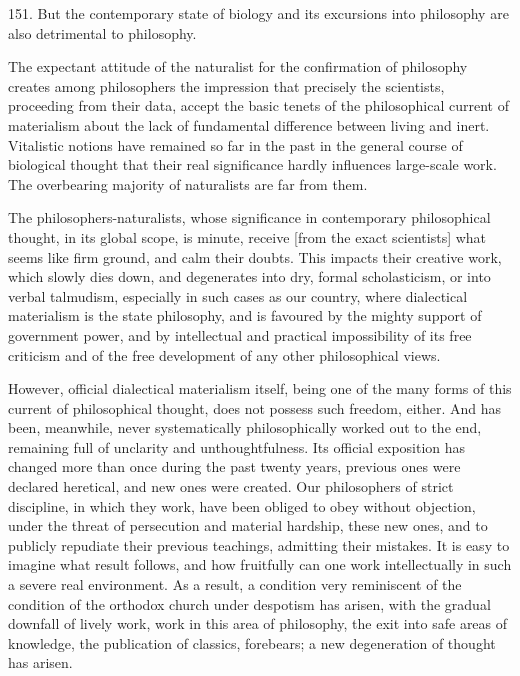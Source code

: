 
151. But the contemporary state of biology and its excursions into philosophy
are also detrimental to philosophy.

The expectant attitude of the naturalist for the confirmation of philosophy
creates among philosophers the impression that precisely the
scientists, proceeding from their data, accept the basic tenets of the
philosophical current of materialism about the lack of fundamental difference
between living and inert.  Vitalistic notions have remained so far in the past
in the general course of biological thought that their real significance hardly
influences large-scale work.  The overbearing majority of naturalists are far
from them.

The philosophers-naturalists, whose significance in contemporary philosophical
thought, in its global scope, is minute, receive [from the exact scientists]
what seems like firm ground, and calm their doubts.  This impacts their
creative work, which slowly dies down, and degenerates into dry, formal
scholasticism, or into verbal talmudism, especially in such cases as our
country, where dialectical materialism is the state philosophy, and is
favoured by the mighty support of government power, and by intellectual and
practical impossibility of its free criticism and of the free development of
any other philosophical views.

However, official dialectical materialism itself, being one of the many forms
of this current of philosophical thought, does not possess such freedom,
either.  And has been, meanwhile, never systematically philosophically worked
out to the end, remaining full of unclarity and unthoughtfulness.  Its official
exposition has changed more than once during the past twenty years, previous
ones were declared heretical, and new ones were created.  Our philosophers of
strict discipline, in which they work, have been obliged to obey without
objection, under the threat of persecution and material hardship, these new
ones, and to publicly repudiate their previous teachings, admitting their
mistakes.  It is easy to imagine what result follows, and how fruitfully can
one work intellectually in such a severe real environment.  As a result, a
condition very reminiscent of the condition of the orthodox church under
despotism has arisen, with the gradual downfall of lively work, work in this
area of philosophy, the exit into safe areas of knowledge, the publication of
classics, forebears; a new degeneration of thought has arisen.


